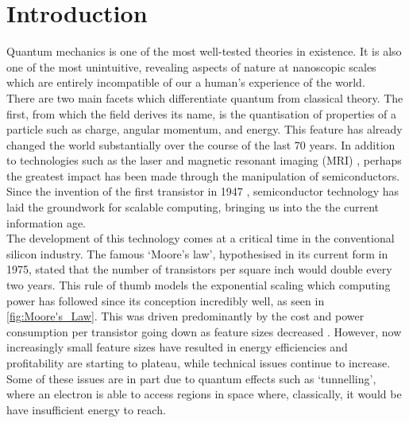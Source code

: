 \chapter*{Introduction}


Quantum mechanics is one of the most well-tested theories in existence. It is also one of the most unintuitive, revealing aspects of nature at nanoscopic scales which are entirely incompatible of our a human's experience of the world. \\

There are two main facets which differentiate quantum from classical theory. The first, from which the field derives its name, is the quantisation of properties of a particle such as charge, angular momentum, and energy. This feature has already changed the world substantially over the course of the last 70 years. In addition to technologies such as the laser and magnetic resonant imaging (MRI) \cite{ioplasers, odaibo2012quantumMRI}, perhaps the greatest impact has been made through the manipulation of semiconductors. Since the invention of the first transistor in 1947 \cite{Bardeen1948}, semiconductor technology has laid the groundwork for scalable computing, bringing us into the the current information age. \\

The development of this technology comes at a critical time in the conventional silicon industry. The famous `Moore's law', hypothesised in its current form in 1975, stated that the number of transistors per square inch would double every two years. This rule of thumb models the exponential scaling which computing power has followed since its conception incredibly well, as seen in \autoref{fig:Moore's_Law}. This was driven predominantly by the cost and power consumption per transistor going down as feature sizes decreased \cite{MooresLawEconomist}.  However, now increasingly small feature sizes have resulted in energy efficiencies and profitability are starting to plateau, while technical issues continue to increase. Some of these issues are in part due to quantum effects such as `tunnelling', where an electron is able to access regions in space where, classically, it would be have insufficient energy to reach.   \\

